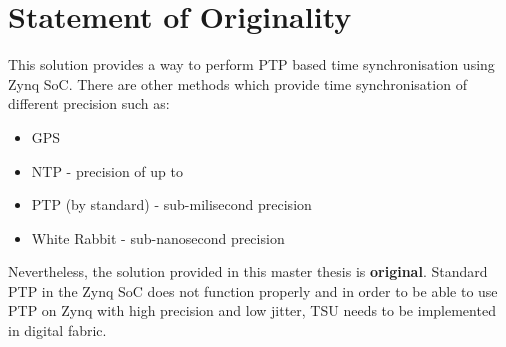\section{Statement of Originality}

This solution provides a way to perform PTP based time synchronisation using Zynq SoC. There are
other methods which provide time synchronisation of different precision such as:
\begin{itemize}
    \item GPS
    \item NTP - precision of up to
    \item PTP (by standard) - sub-milisecond precision 
    \item White Rabbit - sub-nanosecond precision 
\end{itemize}

Nevertheless, the solution provided in this master thesis is \textbf{original}. Standard PTP in the
Zynq SoC does not function properly and in order to be able to use PTP on Zynq with high precision and low jitter,
TSU needs to be implemented in digital fabric.  

